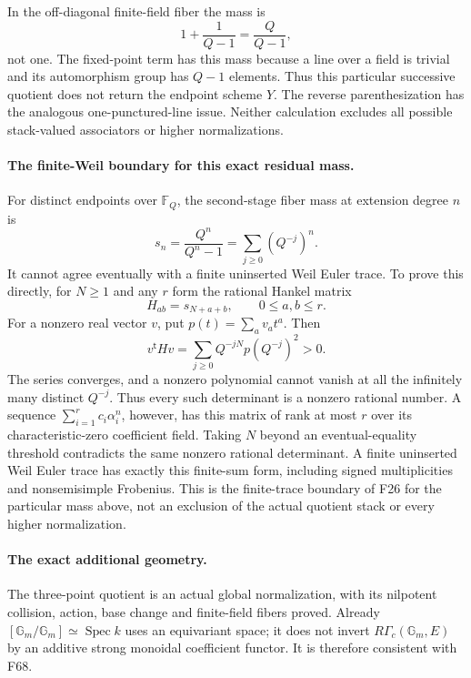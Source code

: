 \documentclass[11pt,a4paper]{article}
\newcommand{\fid}[1]{\textsf{#1}}\newcommand{\gate}[1]{\textsf{#1}}
\theoremstyle{named}\newtheorem{finding}{Finding}[section]
\theoremstyle{definition}\newtheorem{definition}[finding]{Definition}
\theoremstyle{remark}\newtheorem{remark}[finding]{Remark}
\begin{document}
In the off-diagonal finite-field fiber the mass is
\[
                  1+\frac1{Q-1}=\frac Q{Q-1},
\]
not one. The fixed-point term has this mass because
a line over a field is trivial and its automorphism
group has \(Q-1\) elements.
Thus this particular successive quotient does not
return the endpoint scheme \(Y\).
The reverse parenthesization has the analogous
one-punctured-line issue.
Neither calculation excludes all possible
stack-valued associators or higher normalizations.

\paragraph{The finite-Weil boundary for this exact residual mass.}
For distinct endpoints over \(\mathbb F_Q\),
the second-stage fiber mass at extension degree \(n\) is
\begin{equation}\label{eq:variableQuotientResidualMass}
       s_n=\frac{Q^n}{Q^n-1}
                   =\sum_{j\ge0}(Q^{-j})^n.
\end{equation}
It cannot agree eventually with a finite
uninserted Weil Euler trace.
To prove this directly, for \(N\ge1\) and any \(r\)
form the rational Hankel matrix
\[
             H_{ab}=s_{N+a+b},\qquad 0\le a,b\le r.
\]
For a nonzero real vector \(v\), put
\(p(t)=\sum_av_at^a\). Then
\[
 v^{\mathsf t}Hv
     =\sum_{j\ge0}Q^{-jN}p(Q^{-j})^2>0.
\]
The series converges, and a nonzero polynomial
cannot vanish at all the infinitely many distinct
\(Q^{-j}\).
Thus every such determinant is a nonzero rational number.
A sequence \(\sum_{i=1}^rc_i\alpha_i^n\), however,
has this matrix of rank at most \(r\) over its
characteristic-zero coefficient field.
Taking \(N\) beyond an eventual-equality threshold
contradicts the same nonzero rational determinant.
A finite uninserted Weil Euler trace has exactly
this finite-sum form, including signed multiplicities
and nonsemisimple Frobenius.
This is the finite-trace boundary of \fid{F26}
for the particular mass above, not an exclusion
of the actual quotient stack or every higher normalization.

\paragraph{The exact additional geometry.}
The three-point quotient is an actual global
normalization, with its nilpotent collision, action,
base change and finite-field fibers proved.
Already \([\mathbb G_m/\mathbb G_m]\simeq\operatorname{Spec}k\)
uses an equivariant space; it does not invert
\(R\Gamma_c(\mathbb G_m,E)\) by an additive strong
monoidal coefficient functor.
It is therefore consistent with \fid{F68}.
\end{document}

